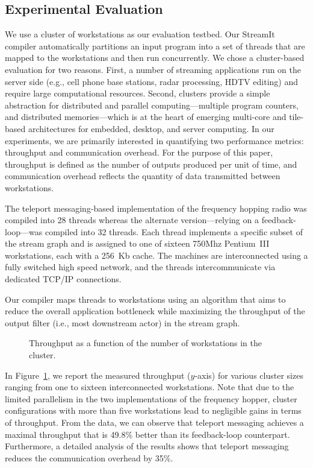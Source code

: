 \subsection{Experimental Evaluation}
\label{sec:evaluation}

We use a cluster of workstations as our evaluation testbed. Our
StreamIt compiler automatically partitions an input program into a set
of threads that are mapped to the workstations and then run concurrently.
We chose a cluster-based evaluation for two reasons. 
First, a number of streaming applications run on the server side
(e.g., cell phone base stations, radar processing, HDTV editing) and
require large computational resources. Second, clusters provide a
simple abstraction for distributed and parallel computing---multiple program
counters, and distributed memories---which 
is at the heart of emerging multi-core and tile-based architectures
for embedded, desktop, and server computing.
In our experiments, we are primarily interested in quantifying two
performance metrics: throughput and communication overhead.
For the purpose of this paper, throughput is defined
as the number of outputs produced per unit of time, and communication
overhead reflects the quantity of data transmitted between
workstations.


The teleport messaging-based implementation of the frequency hopping
radio was compiled into 28 threads
whereas the alternate version---relying on a feedback-loop---was
compiled into 32 threads.  Each thread implements a
specific subset of the stream graph  and is assigned to one of
sixteen 750Mhz Pentium~III workstations, each with a
256~Kb cache.  The machines are interconnected using a fully switched
high speed network, and the threads intercommunicate via
dedicated  TCP/IP connections. 

Our compiler maps threads to workstations using an algorithm that aims
to reduce the overall application bottleneck while
maximizing the throughput of the output filter (i.e., most downstream
actor) in the stream graph.

\begin{figure}[t]
\caption{\small Throughput as a function of the number of workstations
in the cluster. 
\protect\label{fig:fhr-throughput}}
\end{figure}

In Figure~\ref{fig:fhr-throughput}, we report the measured throughput 
($y$-axis) for various cluster sizes ranging from one to sixteen
interconnected workstations. Note that due to the limited parallelism in the
two implementations of the frequency hopper, cluster configurations
with more than five workstations lead to negligible gains in
terms of throughput. From the data, we can observe that teleport
messaging achieves a maximal throughput that is 49.8\% better than its
feedback-loop counterpart. Furthermore, a detailed analysis of the
results shows that teleport messaging reduces the communication
overhead by 35\%.



